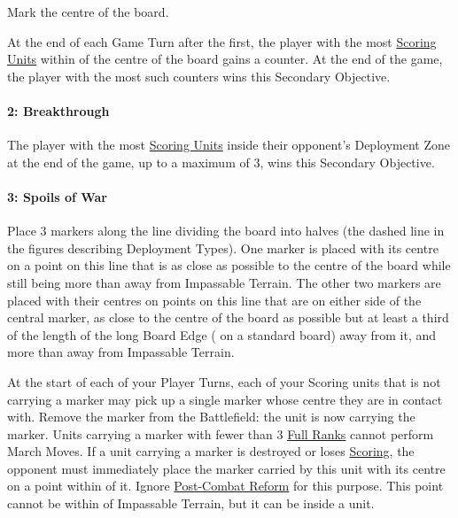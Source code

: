 \newline
Mark the centre of the board.

At the end of each Game Turn after the first, the player with the most \hyperref[scoring]{Scoring Units} within  of the centre of the board gains a counter. At the end of the game, the player with the most such counters wins this Secondary Objective.

\paragraph{2: Breakthrough}

\newline
The player with the most \hyperref[scoring]{Scoring Units} inside their opponent's Deployment Zone at the end of the game, up to a maximum of 3, wins this Secondary Objective.

\paragraph{3: Spoils of War}

\newline
Place 3 markers along the line dividing the board into halves (the dashed line in the figures describing Deployment Types). One marker is placed with its centre on a point on this line that is as close as possible to the centre of the board while still being more than  away from Impassable Terrain. The other two markers are placed with their centres on points on this line that are on either side of the central marker, as close to the centre of the board as possible but at least a third of the length of the long Board Edge ( on a standard board) away from it, and more than  away from Impassable Terrain.

At the start of each of your Player Turns, each of your Scoring units that is not carrying a marker may pick up a single marker whose centre they are in contact with. Remove the marker from the Battlefield: the unit is now carrying the marker. Units carrying a marker with fewer than 3 \hyperref[full_ranks]{Full Ranks} cannot perform March Moves. If a unit carrying a marker is destroyed or loses \hyperref[scoring]{Scoring}, the opponent must immediately place the marker carried by this unit with its centre on a point within  of it. Ignore \hyperref[post_combat_reform]{Post-Combat Reform} for this purpose. This point cannot be within  of Impassable Terrain, but it can be inside a unit.


